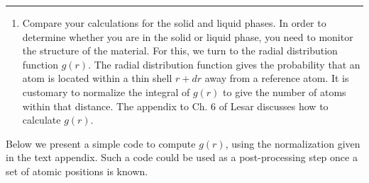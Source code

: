 \documentclass[11pt]{article}
\providecommand{\tightlist}{%
      \setlength{\itemsep}{0pt}\setlength{\parskip}{0pt}}
\begin{document}
\begin{center}\rule{0.5\linewidth}{0.5pt}\end{center}

    \begin{enumerate}
\def\labelenumi{\arabic{enumi}.}
\setcounter{enumi}{9}
\tightlist
\item
  Compare your calculations for the solid and liquid phases. In order to
  determine whether you are in the solid or liquid phase, you need to
  monitor the structure of the material. For this, we turn to the radial
  distribution function \(g(r)\). The radial distribution function gives
  the probability that an atom is located within a thin shell \(r + dr\)
  away from a reference atom. It is customary to normalize the integral
  of \(g(r)\) to give the number of atoms within that distance. The
  appendix to Ch. 6 of Lesar discusses how to calculate \(g(r)\).
\end{enumerate}

Below we present a simple code to compute \(g(r)\), using the
normalization given in the text appendix. Such a code could be used as a
post-processing step once a set of atomic positions is known.
\end{document}
